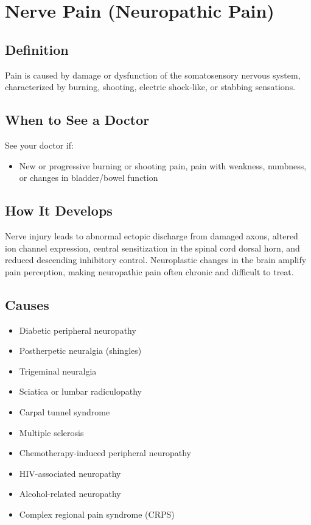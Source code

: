 \chapter{Nerve Pain (Neuropathic Pain)}

\section*{Definition}
Pain is caused by damage or dysfunction of the somatosensory nervous system, characterized by burning, shooting, electric shock-like, or stabbing sensations.

\section*{When to See a Doctor}
See your doctor if:
\begin{itemize}
  \item New or progressive burning or shooting pain, pain with weakness, numbness, or changes in bladder/bowel function
\end{itemize}

\section*{How It Develops}
Nerve injury leads to abnormal ectopic discharge from damaged axons, altered ion channel expression, central sensitization in the spinal cord dorsal horn, and reduced descending inhibitory control. Neuroplastic changes in the brain amplify pain perception, making neuropathic pain often chronic and difficult to treat.

\section*{Causes}
\begin{itemize}
  \item Diabetic peripheral neuropathy
  \item Postherpetic neuralgia (shingles)
  \item Trigeminal neuralgia
  \item Sciatica or lumbar radiculopathy
  \item Carpal tunnel syndrome
  \item Multiple sclerosis
  \item Chemotherapy-induced peripheral neuropathy
  \item HIV-associated neuropathy
  \item Alcohol-related neuropathy
  \item Complex regional pain syndrome (CRPS)
\end{itemize}

